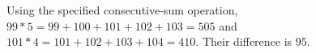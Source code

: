 Using the specified consecutive-sum operation, $99*5=99+100+101+102+103=505$ and $101*4=101+102+103+104=410$. Their difference is $\boxed{95}$.
